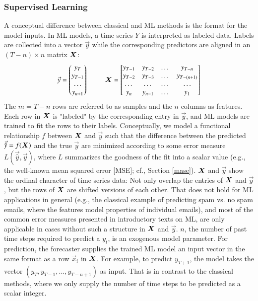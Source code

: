 \subsubsection{Supervised Learning}
\label{learning}

A conceptual difference between classical and ML methods is the format
    for the model inputs.
In ML models, a time series $Y$ is interpreted as labeled data.
Labels are collected into a vector $\vec{y}$ while the corresponding
    predictors are aligned in an $(T - n) \times n$ matrix $\bm{X}$:
$$
\vec{y}
=
\begin{pmatrix}
    y_T \\
    y_{T-1} \\
    \dots \\
    y_{n+1}
\end{pmatrix}
~~~~~~~~~~
\bm{X}
=
\begin{bmatrix}
    y_{T-1} & y_{T-2} & \dots & y_{T-n} \\
    y_{T-2} & y_{T-3} & \dots & y_{T-(n+1)} \\
    \dots   & \dots   & \dots & \dots \\
    y_n     & y_{n-1} & \dots & y_1
\end{bmatrix}
$$
The $m = T - n$ rows are referred to as samples and the $n$ columns as
    features.
Each row in $\bm{X}$ is "labeled" by the corresponding entry in $\vec{y}$,
    and ML models are trained to fit the rows to their labels.
Conceptually, we model a functional relationship $f$ between $\bm{X}$ and
    $\vec{y}$ such that the difference between the predicted
    $\vec{\hat{y}} = f(\bm{X})$ and the true $\vec{y}$ are minimized
    according to some error measure $L(\vec{\hat{y}}, \vec{y})$, where $L$
    summarizes the goodness of the fit into a scalar value (e.g., the
    well-known mean squared error [MSE]; cf., Section \ref{mase}).
$\bm{X}$ and $\vec{y}$ show the ordinal character of time series data:
    Not only overlap the entries of $\bm{X}$ and $\vec{y}$, but the rows of
    $\bm{X}$ are shifted versions of each other.
That does not hold for ML applications in general (e.g., the classical
    example of predicting spam vs. no spam emails, where the features model
    properties of individual emails), and most of the common error measures
    presented in introductory texts on ML, are only applicable in cases
    without such a structure in $\bm{X}$ and $\vec{y}$.
$n$, the number of past time steps required to predict a $y_t$, is an
    exogenous model parameter.
For prediction, the forecaster supplies the trained ML model an input
    vector in the same format as a row $\vec{x}_i$ in $\bm{X}$.
For example, to predict $y_{T+1}$, the model takes the vector
    $(y_T, y_{T-1}, ..., y_{T-n+1})$ as input.
That is in contrast to the classical methods, where we only supply the number
    of time steps to be predicted as a scalar integer.

